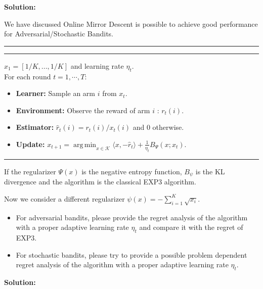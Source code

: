 \documentclass[11pt,oneside,a4paper]{article}
\DeclareMathOperator*{\argmin}{arg\,min}
\begin{document}
\vspace{0.5cm}
{\noindent \bf Solution:}


\newpage
{}
\vspace{0.5cm}

\noindent We have discussed Online Mirror Descent is possible to achieve good performance for Adversarial/Stochastic Bandits. 
\vspace{0.05in}
\hrule
\vspace{0.05in}
\vspace{0.05in}
\hrule
\vspace{0.05in}

 $x_1 = [1/K,...,1/K]$ and learning rate $\eta_t$. \\
\noindent For each round $t=1,\cdots, T:$ 
\begin{itemize}
\item {\bf Learner:}  Sample an arm $i$ from $x_t$.
\item {\bf Environment:} Observe the reward of arm $i$ : $r_t(i)$.
\item {\bf Estimator:} $\hat{r}_t(i) = r_t(i)/x_t(i)$ and 0 otherwise.
\item {\bf Update:} $x_{t+1} = \argmin_{x \in \mathcal K} \langle x, -\hat{r}_t \rangle + \frac{1}{\eta_t} B_{\Psi}(x;x_t).$
\end{itemize}
\vspace{0.02in}
\hrule
\vspace{0.1in}

\noindent If the regularizer $\Psi(x)$ is the negative entropy function, $B_{\psi}$ is the KL divergence and the algorithm is the classical EXP3 algorithm. 
\vspace{0.1cm}

\noindent Now we consider a different regularizer $\psi(x) = -\sum_{i=1}^K \sqrt{x_i}.$
\begin{itemize}
    \item For adversarial bandits, please provide the regret analysis of the algorithm with a proper adaptive learning rate $\eta_t$ and compare it with the regret of EXP3.
    \item For stochastic bandits, please try to provide a possible problem dependent regret analysis of the algorithm with a proper adaptive learning rate $\eta_t$.
\end{itemize}
\vspace{0.5cm}
{\noindent \bf Solution:}
\end{document}
